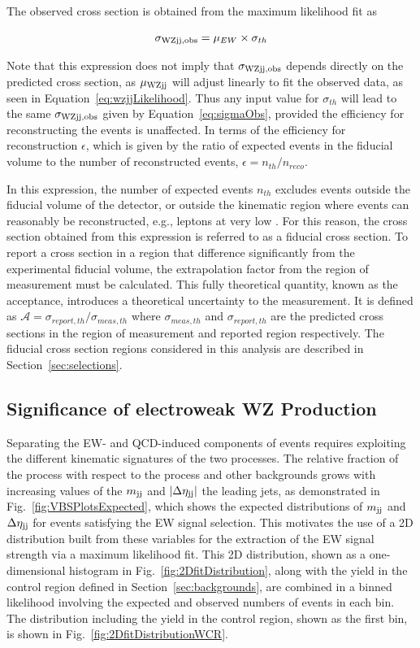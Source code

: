 The observed cross section is obtained from the maximum likelihood fit as 

\begin{equation}
  \sigma_{\rm {WZjj} , obs} = \mu_{EW}\times\sigma_{th}
  \label{eq:sigmaObs}
\end{equation}

Note that this expression does not imply that $\sigma_{\rm {WZjj}, obs}$
depends directly on the predicted cross section, as $\mu_{\rm {WZjj}}$ will adjust
linearly to fit the observed data, as seen in Equation~\ref{eq:wzjjLikelihood}.
Thus any input value for $\sigma_{th}$ will lead to the same $\sigma_{\rm {WZjj} , obs}$
given by Equation~\ref{eq:sigmaObs}, provided the efficiency for
reconstructing the events is unaffected. In terms of the efficiency for reconstruction
$\epsilon$, which is given by the ratio of expected events in the fiducial
volume to the number of reconstructed events,  $\epsilon = n_{th}/n_{reco}$.

In this expression, the number of expected events $n_{th}$ excludes events
outside the fiducial volume of the detector, or outside the kinematic region
where events can reasonably be reconstructed, e.g., leptons at very low \pt.
For this reason, the cross section obtained from this expression is referred to 
as a fiducial cross section.
To report a cross section in a region that difference significantly from the 
experimental fiducial volume, the extrapolation factor from the region
of measurement must be calculated. This fully theoretical quantity, known
as the acceptance, introduces a theoretical uncertainty to the measurement.
It is defined as $\mathcal{A} = \sigma_{report, th}/\sigma_{meas, th}$ where
$\sigma_{meas, th}$ and $\sigma_{report, th}$ are the predicted cross sections
in the region of measurement and reported region respectively. The fiducial
cross section regions considered in this analysis are described in Section~\ref{sec:selections}.

\subsection{Significance of electroweak WZ Production}

Separating the EW- and QCD-induced components of \WZjj events requires exploiting the different 
kinematic signatures of the two processes.
The relative fraction of the \EWWZ process with respect to the \QCDWZ process and other backgrounds
grows with increasing values of the $m_{\mathrm{jj}}$ and $\left|\Delta\eta_{\mathrm{jj}}\right|$
the leading jets, as demonstrated in Fig.~\ref{fig:VBSPlotsExpected},
which shows the expected distributions of $m_{\mathrm{jj}}$ and $\Delta\eta_{\mathrm{jj}}$ for events satisfying the EW signal selection.
This motivates the use of a 2D distribution built from these variables for the extraction of the EW \WZjj
signal strength via a maximum likelihood fit.
This 2D distribution, 
shown as a one-dimensional histogram in Fig.~\ref{fig:2DfitDistribution},
along with the yield in the control region defined in 
Section~\ref{sec:backgrounds}, are combined in a binned likelihood
involving the expected and observed numbers of events in each bin.
The distribution including the yield in the \QCDWZ control region, shown as the first bin,
is shown in Fig.~\ref{fig:2DfitDistributionWCR}.

